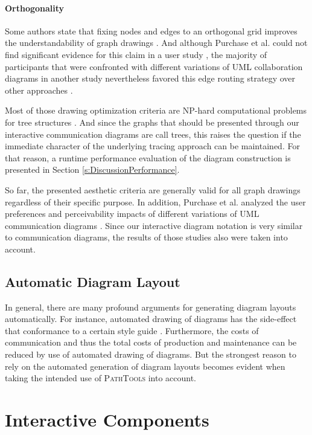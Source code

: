 \paragraph{Orthogonality} Some authors state that fixing nodes and edges to an orthogonal grid improves the understandability of graph drawings \cite{sugiyama_methods_1981, batini_what_1985}.
And although Purchase et al. could not find significant evidence for this claim in a user study \cite{purchase_which_1997}, the majority of participants that were confronted with different variations of UML collaboration diagrams in another study nevertheless favored this edge routing strategy over other approaches \cite{purchase_graph_2004}.

Most of those drawing optimization criteria are NP-hard computational problems for tree structures \cite{battista_graph_1998}.
And since the graphs that should be presented through our interactive communication diagrams are call trees, this raises the question if the immediate character of the underlying tracing approach can be maintained.
For that reason, a runtime performance evaluation of the diagram construction is presented in Section \ref{s:DiscussionPerformance}.

So far, the presented aesthetic criteria are generally valid for all graph drawings regardless of their specific purpose.
In addition, Purchase et al. analyzed the user preferences and perceivability impacts of different variations of UML communication diagrams \cite{purchase_uml_2002, purchase_graph_2004}.
Since our interactive diagram notation is very similar to communication diagrams, the results of those studies also were taken into account.

\subsection{Automatic Diagram Layout}
In general, there are many profound arguments for generating diagram layouts automatically.
For instance, automated drawing of diagrams has the side-effect that conformance to a certain style guide .
Furthermore, the costs of communication and thus the total costs of production and maintenance can be reduced by use of automated drawing of diagrams.
But the strongest reason to rely on the automated generation of diagram layouts becomes evident when taking the intended use of \textsc{PathTools} into account.


\section{Interactive Components}

